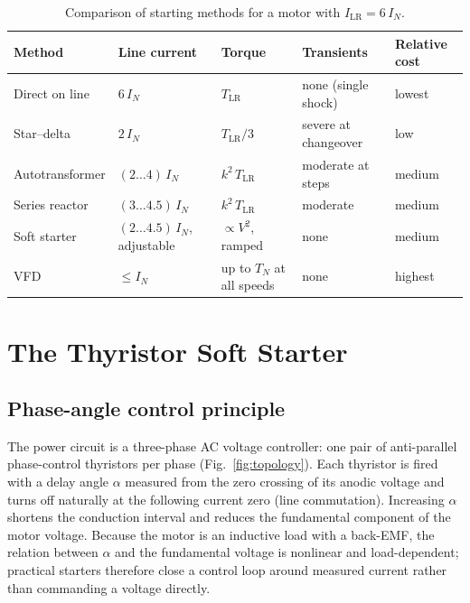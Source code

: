 \documentclass[11pt,a4paper]{article}
\begin{document}
\begin{table}[htb]
\centering
\caption{Comparison of starting methods for a motor with
$I_\mathrm{LR} = 6\,I_N$.}
\label{tab:methods}
\begin{tabular}{@{}lllll@{}}
\toprule
Method & Line current & Torque & Transients & Relative cost \\
\midrule
Direct on line      & $6\,I_N$            & $T_\mathrm{LR}$        & none (single shock) & lowest \\
Star--delta         & $2\,I_N$            & $T_\mathrm{LR}/3$      & severe at changeover & low \\
Autotransformer     & $(2\ldots4)\,I_N$   & $k^2\,T_\mathrm{LR}$   & moderate at steps    & medium \\
Series reactor      & $(3\ldots4.5)\,I_N$ & $k^2\,T_\mathrm{LR}$   & moderate             & medium \\
Soft starter        & $(2\ldots4.5)\,I_N$, adjustable & $\propto V^2$, ramped & none & medium \\
VFD                 & $\leq I_N$          & up to $T_N$ at all speeds & none & highest \\
\bottomrule
\end{tabular}
\end{table}

\section{The Thyristor Soft Starter}

\subsection{Phase-angle control principle}

The power circuit is a three-phase AC voltage controller: one pair of
anti-parallel phase-control thyristors per phase
(Fig.~\ref{fig:topology}). Each thyristor is fired with a delay angle
$\alpha$ measured from the zero crossing of its anodic voltage and turns off
naturally at the following current zero (line commutation). Increasing
$\alpha$ shortens the conduction interval and reduces the fundamental
component of the motor voltage. Because the motor is an inductive load with a
back-EMF, the relation between $\alpha$ and the fundamental voltage is
nonlinear and load-dependent; practical starters therefore close a control
loop around measured current rather than commanding a voltage directly.
\end{document}
